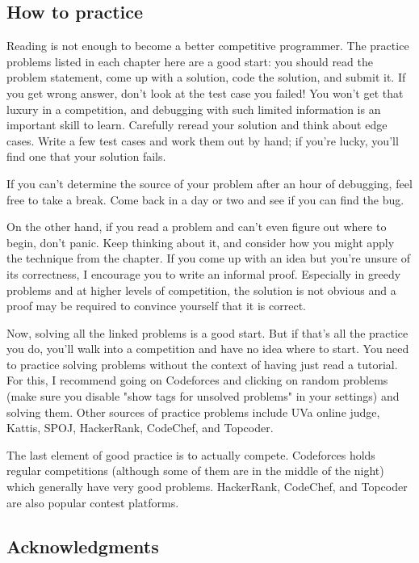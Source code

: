 \subsection*{How to practice}

Reading is not enough to become a better competitive programmer. The practice problems listed in each chapter here are a good start: you should read the problem statement, come up with a solution, code the solution, and submit it. If you get wrong answer, don't look at the test case you failed! You won't get that luxury in a competition, and debugging with such limited information is an important skill to learn. Carefully reread your solution and think about edge cases. Write a few test cases and work them out by hand; if you're lucky, you'll find one that your solution fails.

If you can't determine the source of your problem after an hour of debugging, feel free to take a break. Come back in a day or two and see if you can find the bug.

On the other hand, if you read a problem and can't even figure out where to begin, don't panic. Keep thinking about it, and consider how you might apply the technique from the chapter. If you come up with an idea but you're unsure of its correctness, I encourage you to write an informal proof. Especially in greedy problems and at higher levels of competition, the solution is not obvious and a proof may be required to convince yourself that it is correct.

Now, solving all the linked problems is a good start. But if that's all the practice you do, you'll walk into a competition and have no idea where to start. You need to practice solving problems without the context of having just read a tutorial. For this, I recommend going on Codeforces and clicking on random problems (make sure you disable "show tags for unsolved problems" in your settings) and solving them. Other sources of practice problems include UVa online judge, Kattis, SPOJ, HackerRank, CodeChef, and Topcoder.

The last element of good practice is to actually compete. Codeforces holds regular competitions (although some of them are in the middle of the night) which generally have very good problems. HackerRank, CodeChef, and Topcoder are also popular contest platforms.

\subsection*{Acknowledgments}